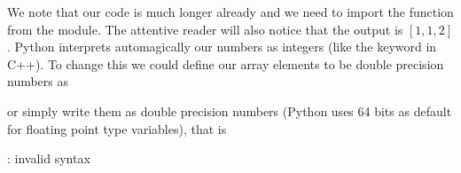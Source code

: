 \documentclass[letterpaper,10pt,english]{sphinxmanual}
\begin{document}
\begin{sphinxVerbatim}[commandchars=\\\{\}]
[1 1 2]
\end{sphinxVerbatim}

We note that our code is much longer already and we need to import the  function from the  module.
The attentive reader will also notice that the output is \([1, 1, 2]\). Python interprets automagically our numbers as integers (like the  keyword in C++). To change this we could define our array elements to be double precision numbers as

\begin{sphinxVerbatim}[commandchars=\\\{\}]
   
  \PYG{p}{[}  \PYG{p}{]}   
\end{sphinxVerbatim}

\begin{sphinxVerbatim}[commandchars=\\\{\}]
[1.38629436 1.94591015 2.07944154]
\end{sphinxVerbatim}

or simply write them as double precision numbers (Python uses 64 bits as default for floating point type variables), that is

\begin{sphinxVerbatim}[commandchars=\\\{\}]
   
  \PYG{p}{[}  \PYG{p}{]}
\end{sphinxVerbatim}

\begin{sphinxVerbatim}[commandchars=\\\{\}]
: invalid syntax
\end{sphinxVerbatim}
\end{document}

